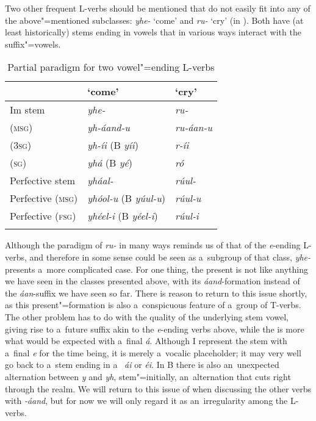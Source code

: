 Two other frequent L-verbs should be mentioned that do not easily fit into any of the above"=mentioned subclasses: \textit{yhe-} `come' and \textit{ru-} `cry' (in ). Both have (at least historically) stems ending in vowels that in various ways interact with the suffix"=vowels. 


\begin{table}
\caption{Partial paradigm for two vowel"=ending L-verbs}
\begin{tabularx}{\textwidth}{ Q Q Q }
\lsptoprule
&
`come' &
`cry'\\\midrule
Im stem &
\textit{yhe-} &
\textit{ru-} \\
 (\textsc{msg}) &
\textit{yh-áand-u} &
\textit{ru-áan-u} \\
 (\textsc{3sg}) &
\textit{yh-íi} (B \textit{yíi}) &
\textit{r-íi} \\
 (\textsc{sg}) &
\textit{yhá} (B \textit{yé}) &
\textit{ró} \\
Perfective stem &
\textit{yháal-} &
\textit{rúul-} \\
Perfective (\textsc{msg}) &
\textit{yhóol-u} (B \textit{yúul-u}) &
\textit{rúul-u} \\
Perfective (\textsc{fsg}) &
\textit{yhéel-i} (B \textit{yéel-i}) &
\textit{rúul-i} \\\lspbottomrule
\end{tabularx}
\label{tab:8-7}
\end{table}


Although the paradigm of \textit{ru-} in many ways reminds us of that of the \textit{e}-ending L-verbs, and therefore in some sense could be seen as a~subgroup of that class, \textit{yhe-} presents a~more complicated case. For one thing, the present  is not like anything we have seen in the classes presented above, with its \textit{áand}-formation instead of the \textit{áan}-suffix we have seen so far. There is reason to return to this issue shortly, as this present"=formation is also a~conspicuous feature of a~group of T-verbs. The other problem has to do with the quality of the underlying stem vowel, giving rise to a~future suffix akin to the \textit{e}-ending verbs above, while the  is more what would be expected with a~final \textit{á}. Although I represent the stem with a~final \textit{e} for the time being, it is merely a~vocalic placeholder; it may very well go back to a~stem ending in a~ \textit{ái} or \textit{éi}. In B there is also an~unexpected alternation between \textit{y} and \textit{yh}, stem"=initially, an~alternation that cuts right through the  realm. We will return to this issue of  when discussing the other verbs with \textit{-áand}, but for now we will only regard it as an~irregularity among the L-verbs.


